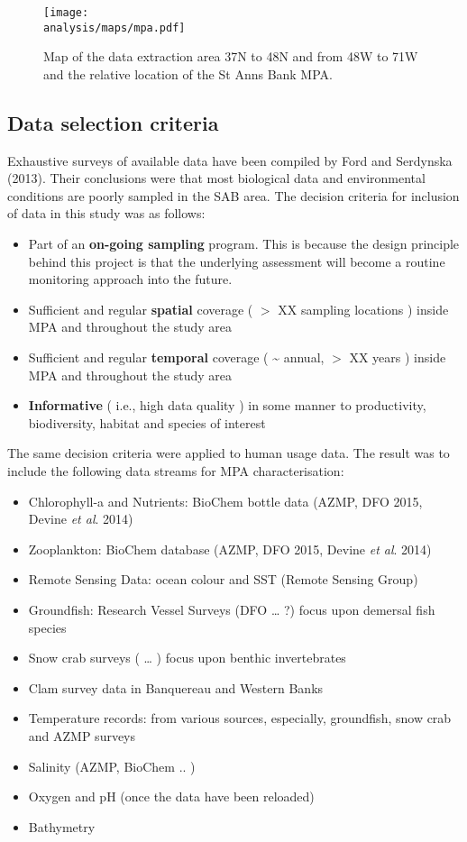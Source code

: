 \documentclass[letterpaper,portrait,11pt]{scrartcl}
\numberwithin{equation}{section}		%
\numberwithin{figure}{section}			%
\numberwithin{table}{section}				%
\newcommand{\ecomod}{\string~/ecomod_data/}   %
\newcommand{\analysis}{\ecomod/mpa/analysis/}   %
\begin{document}
\begin{figure}[h]
  \centering
  \texttt{[image: \\analysis/maps/mpa.pdf]}
  \caption{Map of the data extraction area 37N to 48N and from 48W to 71W and the relative location of the St Anns Bank MPA.}
  \label{figSAB}
\end{figure}


\subsection{Data selection criteria}
Exhaustive surveys of available data have been compiled by Ford and Serdynska (2013). Their conclusions were that most biological data and environmental conditions are poorly sampled in the SAB area. 
The decision criteria for inclusion of data in this study was as follows:

\begin{itemize}
	\item Part of an \textbf{on-going sampling }program. This is because the design principle behind this project is that the underlying  assessment will become a routine monitoring approach into the future.
  \item	Sufficient and regular \textbf{spatial} coverage ( $>$ XX sampling locations ) inside MPA and throughout the study area
  \item Sufficient and regular \textbf{temporal} coverage ( \~{} annual, $>$ XX years ) inside MPA and throughout the study area
  \item \textbf{Informative} ( i.e., high data quality ) in some manner to productivity, biodiversity, habitat and species of interest
\end{itemize}

The same decision criteria were applied to human usage data. The result was to include the following data streams for MPA characterisation:

\begin{itemize}
	\item Chlorophyll-a and Nutrients: BioChem bottle data (AZMP, DFO 2015, Devine \textit{et al}. 2014) 
  \item Zooplankton: BioChem database (AZMP, DFO 2015, Devine \textit{et al}. 2014) 
  \item Remote Sensing Data: ocean colour and SST (Remote Sensing Group)
  \item Groundfish: Research Vessel Surveys (DFO \ldots{} ?)  focus upon demersal fish species
  \item Snow crab surveys ( \ldots{} ) focus upon benthic invertebrates
  \item Clam survey data in Banquereau and Western Banks
  \item Temperature records: from various sources, especially, groundfish, snow crab and AZMP surveys
  \item Salinity (AZMP, BioChem .. )
  \item Oxygen and pH (once the data have been reloaded)
  \item Bathymetry
\end{itemize}
\end{document}
